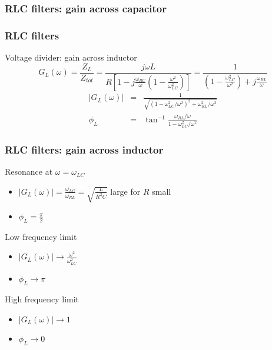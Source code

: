 \documentclass[beamer]{standalone}
\begin{document}
\begin{frame}
 \frametitle{RLC filters: gain across capacitor}
 \begin{center}
 \end{center}
\end{frame}

\begin{frame}
 \frametitle{RLC filters}
 \begin{block}{Voltage divider: gain across inductor}
  \begin{equation*}
   G_L(\omega) = \frac{Z_L}{Z_{tot}} = \frac{j\omega L}{R\left[ 1 - j\frac{\omega_{RC}}{\omega} \left( 1 - \frac{\omega^2}{\omega_{LC}^2} \right) \right]} = \frac{1}{\left( 1 - \frac{\omega^2_{LC}}{\omega^2} \right) + j\frac{\omega_{RL}}{\omega}}
  \end{equation*}
  \begin{eqnarray*}
   |G_L(\omega)| & = & \frac{1}{\sqrt{ \left(1 - \omega_{LC}^2/\omega^2 \right)^2 + \omega_{RL}^2/\omega^2}} \\
   \phi_L & = & \tan^{-1} \frac{\omega_{RL}/\omega}{1 - \omega_{LC}^2/\omega^2}
  \end{eqnarray*}
 \end{block}
\end{frame}

\begin{frame}
 \frametitle{RLC filters: gain across inductor}
 \begin{block}{Resonance at $\omega = \omega_{LC}$}
  \begin{itemize}
   \item $|G_L(\omega)| = \frac{\omega_{LC}}{\omega_{RL}} = \sqrt{\frac{L}{R^2 C}}$ large for $R$ small
   \item $\phi_L = \frac{\pi}{2}$
  \end{itemize}
 \end{block}
 \begin{block}{Low frequency limit}
  \begin{itemize}
   \item $|G_L(\omega)| \to \frac{\omega^2}{\omega_{LC}^2}$
   \item $\phi_L \to \pi$
  \end{itemize}
 \end{block}
 \begin{block}{High frequency limit}
  \begin{itemize}
   \item $|G_L(\omega)| \to 1$
   \item $\phi_L \to 0$
  \end{itemize}
 \end{block}
\end{frame}
\end{document}

